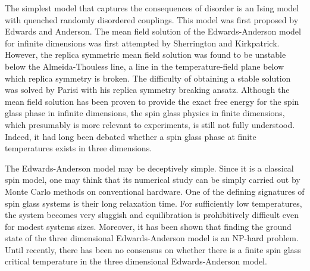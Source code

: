 The simplest model that captures the consequences of disorder is an Ising model 
with quenched randomly disordered couplings. This model was first proposed by Edwards 
and Anderson. \cite{Edwards-Anderson1975} The mean field solution of the Edwards-Anderson 
model for infinite dimensions was first attempted by Sherrington and Kirkpatrick. 
\cite{Sherrington-Kirkpatrick1978} However, the replica symmetric mean field solution was found to be 
unstable below the Almeida-Thouless line, \cite{Almedia-Thouless1978,Bray-Moore-1978}
a line in the temperature-field plane below which replica symmetry is broken. The difficulty 
of obtaining a stable solution was solved by Parisi with his replica symmetry breaking 
ansatz. \cite{Parisi-1979,PhysRevLett.52.1156,Parisi-1980a,Parisi-1980b,Parisi1980,Parisi-dirac-medal-2002} 
Although the mean field solution has been proven to provide the exact free energy for the spin glass phase 
in infinite dimensions, \cite{Talagrand-2006,Guerra-2003} the spin glass 
physics in finite dimensions, which presumably is more relevant to experiments, is 
still not fully understood. Indeed, it had long been debated whether a spin glass 
phase at finite temperatures exists in three dimensions.

The Edwards-Anderson model may be deceptively simple. Since it is a classical spin 
model, one may think that its numerical study can be simply carried out by Monte 
Carlo methods on conventional hardware. One of the defining signatures of 
spin glass systems is their long relaxation time. For sufficiently low temperatures, the 
system becomes very sluggish and equilibration is prohibitively difficult  
even for modest systems sizes.  Moreover, it has been shown
that finding the ground state of the three dimensional Edwards-Anderson model is
an NP-hard problem. \cite{Barahona-1982} Until recently, there has been no %
consensus on whether there is a finite spin glass critical temperature in the three 
dimensional Edwards-Anderson model.

